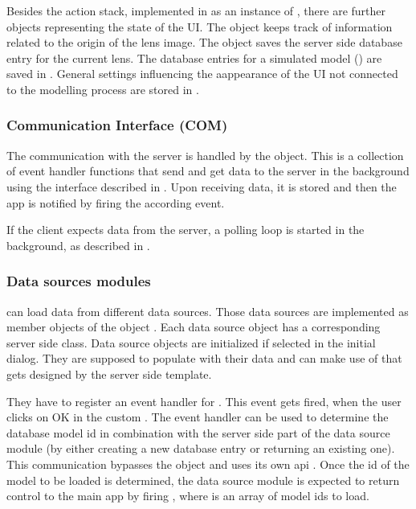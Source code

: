 

Besides the action stack, implemented in  as an instance of , there are further objects representing the state of the UI.
The object  keeps track of information related to the origin of the lens image.
The object  saves the server side database entry for the current lens.
The database entries for a simulated model () are saved in .
General settings influencing the aappearance of the UI not connected to the modelling process are stored in .




\subsubsection{Communication Interface (COM)}
The communication with the server is handled by the  object.
This is a collection of event handler functions that send and get data to the server in the background using the interface described in .
Upon receiving data, it is stored and then the app is notified by firing the according event.

If the client expects data from the server, a polling loop is started in the background, as described in .


\subsubsection{Data sources modules}

\spl can load data from different data sources.
Those data sources are implemented as member objects of the object .
Each data source object has a corresponding server side class.
Data source objects are initialized if selected in the initial dialog.
They are supposed to populate  with their data and can make use of  that gets designed by the server side template.

They have to register an event handler for .
This event gets fired, when the user clicks on OK in the custom .
The event handler can be used to determine the database model id in combination with the server side part of the data source module (by either creating a new database entry or returning an existing one). This communication bypasses the  object and uses its own api .
Once the id of the model to be loaded is determined, the data source module is expected to return control to the main app by firing , where  is an array of model ids to load.

